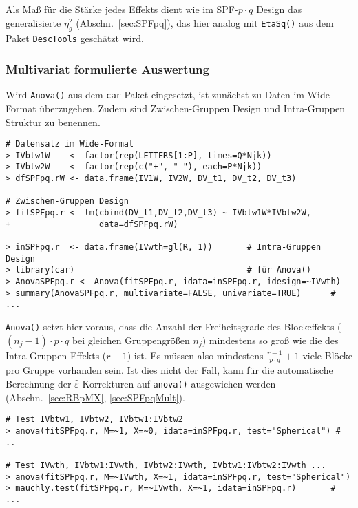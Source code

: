 Als Maß für die Stärke jedes Effekts dient wie im SPF-$p \cdot q$ Design das generalisierte $\eta_{g}^{2}$ (Abschn.\ \ref{sec:SPFpq}), das hier analog mit \lstinline!EtaSq()! aus dem Paket \lstinline!DescTools! geschätzt wird.

\subsubsection{Multivariat formulierte Auswertung}

Wird \lstinline!Anova()! aus dem \lstinline!car! Paket eingesetzt, ist zunächst zu Daten im Wide-Format überzugehen. Zudem sind Zwischen-Gruppen Design und Intra-Gruppen Struktur zu benennen.
\begin{lstlisting}
# Datensatz im Wide-Format
> IVbtw1W    <- factor(rep(LETTERS[1:P], times=Q*Njk))
> IVbtw2W    <- factor(rep(c("+", "-"), each=P*Njk))
> dfSPFpq.rW <- data.frame(IV1W, IV2W, DV_t1, DV_t2, DV_t3)

# Zwischen-Gruppen Design
> fitSPFpq.r <- lm(cbind(DV_t1,DV_t2,DV_t3) ~ IVbtw1W*IVbtw2W,
+                  data=dfSPFpq.rW)

> inSPFpq.r  <- data.frame(IVwth=gl(R, 1))       # Intra-Gruppen Design
> library(car)                                   # für Anova()
> AnovaSPFpq.r <- Anova(fitSPFpq.r, idata=inSPFpq.r, idesign=~IVwth)
> summary(AnovaSPFpq.r, multivariate=FALSE, univariate=TRUE)      # ...
\end{lstlisting}

\lstinline!Anova()! setzt hier voraus, dass die Anzahl der Freiheitsgrade des Blockeffekts ($(n_{j}-1) \cdot p \cdot q$ bei gleichen Gruppengrößen $n_{j}$) mindestens so groß wie die des Intra-Gruppen Effekts ($r-1$) ist. Es müssen also mindestens $\frac{r-1}{p \cdot q} + 1$ viele Blöcke pro Gruppe vorhanden sein. Ist dies nicht der Fall, kann für die automatische Berechnung der $\hat{\varepsilon}$-Korrekturen auf \lstinline!anova()! ausgewichen werden (Abschn.\ \ref{sec:RBpMX}, \ref{sec:SPFpqMult}).
\begin{lstlisting}
# Test IVbtw1, IVbtw2, IVbtw1:IVbtw2
> anova(fitSPFpq.r, M=~1, X=~0, idata=inSPFpq.r, test="Spherical") # ..

# Test IVwth, IVbtw1:IVwth, IVbtw2:IVwth, IVbtw1:IVbtw2:IVwth ...
> anova(fitSPFpq.r, M=~IVwth, X=~1, idata=inSPFpq.r, test="Spherical")
> mauchly.test(fitSPFpq.r, M=~IVwth, X=~1, idata=inSPFpq.r)       # ...
\end{lstlisting}

